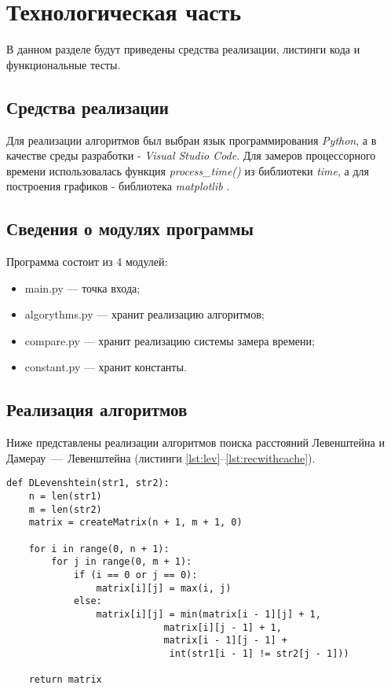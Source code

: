 \chapter{Технологическая часть}

В данном разделе будут приведены средства реализации, листинги кода и функциональные тесты.


\section{Средства реализации}
Для реализации алгоритмов был выбран язык программирования \textit{Python}, а в качестве среды разработки - \textit{Visual Studio Code}.
Для замеров процессорного времени использовалась функция \textit{process\_time()} из библиотеки \textit{time}, а для построения графиков - библиотека \textit{matplotlib} \cite{mpl}.

\section{Сведения о модулях программы}
Программа состоит из 4 модулей:
\begin{itemize}
        \item main.py — точка входа;
        \item algorythms.py — хранит реализацию алгоритмов;
        \item compare.py — хранит реализацию системы замера времени;
        \item constant.py — хранит константы.
\end{itemize} 

\section{Реализация алгоритмов}
Ниже представлены реализации алгоритмов поиска расстояний Левенштейна и Дамерау~---~Левенштейна (листинги \ref{lst:lev}--\ref{lst:recwithcache}).

\begin{center}
    \captionsetup{justification=raggedright,singlelinecheck=off}
    \begin{lstlisting}[label=lst:lev,caption=Итерационный алгоритм поиска расстояния Левенштейна]
def DLevenshtein(str1, str2):
	n = len(str1)
	m = len(str2)
	matrix = createMatrix(n + 1, m + 1, 0)
	
	for i in range(0, n + 1):
		for j in range(0, m + 1):
			if (i == 0 or j == 0):
				matrix[i][j] = max(i, j)
			else:
				matrix[i][j] = min(matrix[i - 1][j] + 1,
							matrix[i][j - 1] + 1,
							matrix[i - 1][j - 1] +
							 int(str1[i - 1] != str2[j - 1]))
	
	return matrix
	
\end{lstlisting}
\end{center}


